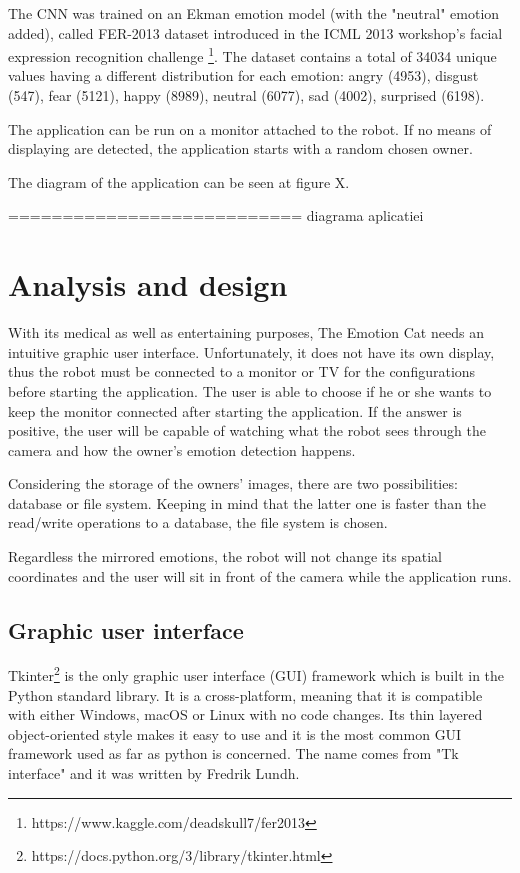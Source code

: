\documentclass[runningheads,a4paper,12pt]{report}
\begin{document}
The CNN was trained on an Ekman emotion model (with the "neutral" emotion added), called FER-2013 dataset introduced in the ICML 2013 workshop's facial expression recognition challenge \footnote{https://www.kaggle.com/deadskull7/fer2013}. The dataset contains a total of 34034 unique values having a different distribution for each emotion: angry (4953), disgust (547), fear (5121), happy (8989), neutral (6077), sad (4002), surprised (6198). 

The application can be run on a monitor attached to the robot. If no means of displaying are detected, the application starts with a random chosen owner. 

The diagram of the application can be seen at figure X.

=========================== diagrama aplicatiei

\section{Analysis and design}
\label{chapter:analysis}
With its medical as well as entertaining purposes, The Emotion Cat needs an intuitive graphic user interface. Unfortunately, it does not have its own display, thus the robot must be connected to a monitor or TV for the configurations before starting the application. The user is able to choose if he or she wants to keep the monitor connected after starting the application. If the answer is positive, the user will be capable of watching what the robot sees through the camera and how the owner's emotion detection happens.

Considering the storage of the owners' images, there are two possibilities: database or file system. Keeping in mind that the latter one is faster than the read/write operations to a database, the file system is chosen. 

Regardless the mirrored emotions, the robot will not change its spatial coordinates and the user will sit in front of the camera while the application runs. 

\subsection{Graphic user interface}
Tkinter\footnote{https://docs.python.org/3/library/tkinter.html} is the only graphic user interface (GUI) framework which is built in the Python standard library. It is a cross-platform, meaning that it is compatible with either Windows, macOS or Linux with no code changes. Its thin layered object-oriented style makes it easy to use and it is the most common GUI framework used as far as python is concerned. The name comes from "Tk interface" and it was written by Fredrik Lundh.  
\end{document}
